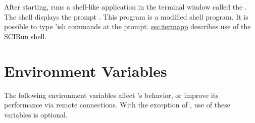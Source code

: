 After starting, \sr{} runs a shell-like application in the
terminal window called the .  The \sr{} shell displays the
prompt .  This program is  a modified  shell program. It is possible to type
'ish \sr{} commands at the prompt.  \hyperref{A later
  section}{Section~}{}{sec:termapp} describes use of the SCIRun shell.


\section{Environment Variables}
\label{sec:environ} 

\newcommand{\envitem}[1]{\item[\envvar{#1}]\latex{\mbox{}\\}}

The following environment variables affect \sr{}'s behavior, or
improve its performance via remote connections.  With the exception of
, use of these variables is
optional.

